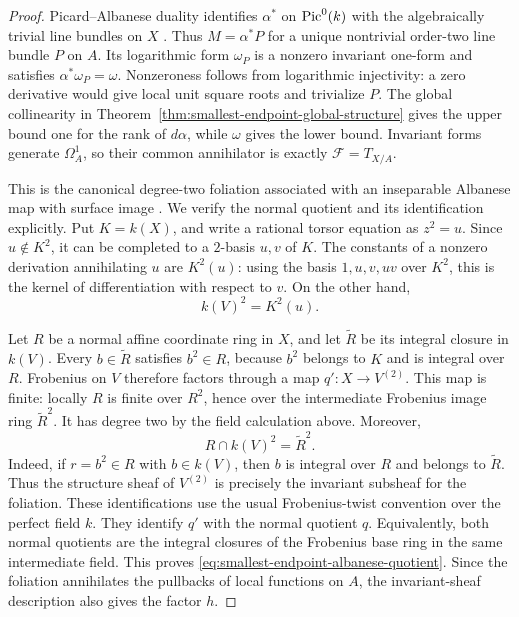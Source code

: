 \begin{proof}
Picard--Albanese duality identifies $\alpha^*$ on $\operatorname{Pic}^0(k)$
with the algebraically trivial line bundles on $X$
\cite[Expos\'e~236, Corollary~3.2 and Theorem~3.3(iii),
pp.~236--238]{FGAPicard}.
Thus $M=\alpha^*P$ for a unique nontrivial order-two line bundle
$P$ on $A$.  Its logarithmic form $\omega_P$ is a nonzero invariant
one-form and satisfies $\alpha^*\omega_P=\omega$.
Nonzeroness follows from logarithmic injectivity: a zero derivative
would give local unit square roots and trivialize $P$.
The global collinearity in
Theorem~\ref{thm:smallest-endpoint-global-structure} gives the upper
bound one for the rank of $d\alpha$, while $\omega$ gives the lower
bound.  Invariant forms generate $\Omega_A^1$, so their common
annihilator is exactly $\mathcal F=T_{X/A}$.

This is the canonical degree-two foliation associated with an
inseparable Albanese map with surface image
\cite[Lemma~2.22 and Remark~2.23, p.~13]{ContiPositiveSeveriComparison}.
We verify the normal quotient and its identification explicitly.
Put $K=k(X)$, and write a rational torsor equation as $z^2=u$.
Since $u\notin K^2$, it can be completed to a $2$-basis $u,v$ of $K$.
The constants of a nonzero derivation annihilating $u$ are
$K^2(u)$: using the basis $1,u,v,uv$ over $K^2$, this is the
kernel of differentiation with respect to $v$.
On the other hand,
\[
 k(V)^2=K^2(u).
\]

Let $R$ be a normal affine coordinate ring in $X$, and let
$\widetilde R$ be its integral closure in $k(V)$.
Every $b\in\widetilde R$ satisfies $b^2\in R$, because $b^2$
belongs to $K$ and is integral over $R$.
Frobenius on $V$ therefore factors through a map
$q':X\to V^{(2)}$.
This map is finite: locally $R$ is finite over $R^2$, hence over
the intermediate Frobenius image ring $\widetilde R^2$.
It has degree two by the field calculation above.
Moreover,
\[
 R\cap k(V)^2=\widetilde R^2.
\]
Indeed, if $r=b^2\in R$ with $b\in k(V)$, then $b$ is integral over
$R$ and belongs to $\widetilde R$.
Thus the structure sheaf of $V^{(2)}$ is precisely the invariant
subsheaf for the foliation.  These identifications use the usual
Frobenius-twist convention over the perfect field $k$.
They identify $q'$ with the normal quotient $q$.
Equivalently, both normal quotients are the integral closures of
the Frobenius base ring in the same intermediate field.
This proves \eqref{eq:smallest-endpoint-albanese-quotient}.
Since the foliation annihilates the pullbacks of local functions
on $A$, the invariant-sheaf description also gives the factor $h$.


\end{proof}
